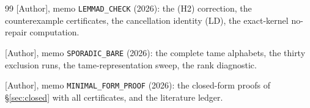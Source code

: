 \documentclass[11pt,reqno]{amsart}
\theoremstyle{plain}
\theoremstyle{definition}
\theoremstyle{remark}
\numberwithin{equation}{section}
\begin{document}
\begin{thebibliography}{99}
[Author], memo \texttt{LEMMAD\_CHECK} (2026): the (H2) correction, the counterexample
certificates, the cancellation identity (LD), the exact-kernel no-repair computation.

[Author], memo \texttt{SPORADIC\_BARE} (2026): the complete tame alphabets, the thirty
exclusion runs, the tame-representation sweep, the rank diagnostic.

[Author], memo \texttt{MINIMAL\_FORM\_PROOF} (2026): the closed-form proofs of
\S\ref{sec:closed} with all certificates, and the literature ledger.

\end{thebibliography}
\end{document}
